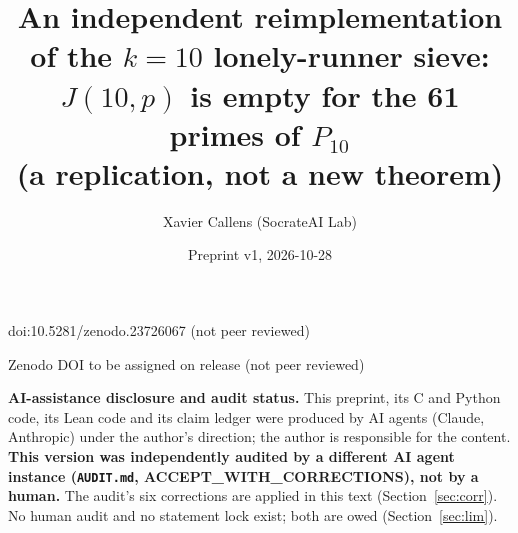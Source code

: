 \documentclass[10pt]{article}
\title{An independent reimplementation of the $k=10$ lonely-runner sieve:\\
$J(10,p)$ is empty for the 61 primes of $P_{10}$\\
{\large (a replication, not a new theorem)}}
\author{Xavier Callens (SocrateAI Lab)}
\date{Preprint v1, 2026-10-28}
\begin{document}
\maketitle
\begin{center}\small doi:10.5281/zenodo.23726067 \quad (not peer reviewed)\end{center}

\begin{center}\small Zenodo DOI to be assigned on release \quad (not peer reviewed)\end{center}

\noindent\textbf{AI-assistance disclosure and audit status.} This preprint, its C and Python code, its Lean code and its claim ledger were
produced by AI agents (Claude, Anthropic) under the author's direction; the author is responsible for the content.
\textbf{This version was independently audited by a different AI agent instance (\texttt{AUDIT.md}, ACCEPT\_WITH\_CORRECTIONS), not by a human.}
The audit's six corrections are applied in this text (Section~\ref{sec:corr}). No human audit and no statement lock exist; both are owed (Section~\ref{sec:lim}).
\end{document}
